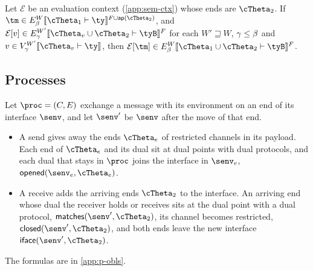 
\begin{lemma}
\label{lem:bind}
Let $\mathcal{E}$ be an evaluation context (\cref{app:sem-ctx}) whose ends are $\cTheta_2$. If $\tm \in \Erel{W}{\ix}{\cTheta_1}{\ty}{F \cup \ap(\cTheta_2)}$, and $\mathcal{E}[v] \in \Erel{W'}{\ixs}{\cTheta_v \cup \cTheta_2}{\tyB}{F}$ for each $W' \sqsupseteq W$, $\gamma \leq \beta$ and $v \in \Vrel{W'}{\ixs}{\cTheta_v}{\ty}$, then $\mathcal{E}[\tm] \in \Erel{W}{\ix}{\cTheta_1 \cup \cTheta_2}{\tyB}{F}$.
\end{lemma}

\subsection{Processes}
\label{sec:proc-rel}

\begin{definition}
\label{def:proc-conds}
Let $\proc = (C, E)$ exchange a message with its environment on an end of its interface $\senv$, and let $\senv'$ be $\senv$ after the move of that end.
\begin{itemize}
  \item A send gives away the ends $\cTheta_e$ of restricted channels in its payload. Each end of $\cTheta_e$ and its dual sit at dual points with dual protocols, and each dual that stays in $\proc$ joins the interface in $\senv_e$, $\mathsf{opened}(\senv_e, \cTheta_e)$.
  \item A receive adds the arriving ends $\cTheta_2$ to the interface. An arriving end whose dual the receiver holds or receives sits at the dual point with a dual protocol, $\mathsf{matches}(\senv', \cTheta_2)$, its channel becomes restricted, $\mathsf{closed}(\senv', \cTheta_2)$, and both ends leave the new interface $\mathsf{iface}(\senv', \cTheta_2)$.
\end{itemize}
The formulas are in \cref{app:p-obls}.
\end{definition}



